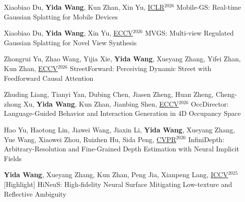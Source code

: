 


\begin{cventries}
\begin{enumerate}[label={[\arabic*]}, leftmargin=*]

\item
\cvpublication
{Xiaobiao Du, \textbf{Yida Wang}, Kun Zhan, Xin Yu, \underline{ICLR}$^{2026}$} %
{Mobile-GS: Real-time Gaussian Splatting for Mobile Devices} %
{} %
{} %

\item
\cvpublication
{Xiaobiao Du, \textbf{Yida Wang}, Xin Yu, \underline{ECCV}$^{2026}$} %
{MVGS: Multi-view Regulated Gaussian Splatting for Novel View Synthesis} %
{} %
{} %

\item
\cvpublication
{Zhongrui Yu, Zhao Wang, Yijia Xie, \textbf{Yida Wang}, Xueyang Zhang, Yifei Zhan, Kun Zhan, \underline{ECCV}$^{2026}$} %
{StreetForward: Perceiving Dynamic Street with Feedforward Causal Attention} %
{} %
{} %

\item
\cvpublication
{Zhuding Liang, Tianyi Yan, Dubing Chen, Jiasen Zheng, Huan Zheng, Cheng-zhong Xu, \textbf{Yida Wang}, Kun Zhan, Jianbing Shen, \underline{ECCV}$^{2026}$} %
{OccDirector: Language-Guided Behavior and Interaction Generation in 4D Occupancy Space} %
{} %
{} %

\item
\cvpublication
{Hao Yu, Haotong Lin, Jiawei Wang, Jiaxin Li, \textbf{Yida Wang}, Xueyang Zhang, Yue Wang, Xiaowei Zhou, Ruizhen Hu, Sida Peng, \underline{CVPR}$^{2026}$} %
{InfiniDepth: Arbitrary-Resolution and Fine-Grained Depth Estimation with Neural Implicit Fields} %
{} %
{} %

\item
\cvpublication
{\textbf{Yida Wang}, Xueyang Zhang, Kun Zhan, Peng Jia, Xianpeng Lang, \underline{ICCV}$^{2025}$ [Highlight]} %
{HiNeuS: High-fidelity Neural Surface Mitigating Low-texture and Reflective Ambiguity} %
{} %
{} %


\end{enumerate}
\end{cventries}
